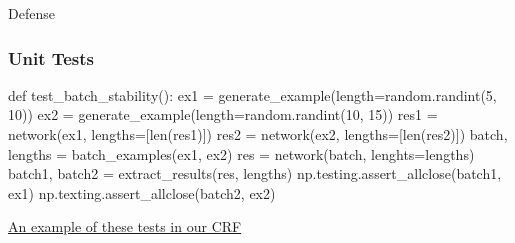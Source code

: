 \documentclass{beamer}
\begin{document}
\begin{section}{Defense}

\begin{frame}[fragile]
    \frametitle{Unit Tests}
    \begin{pythoncode}
def test_batch_stability():
    ex1 = generate_example(length=random.randint(5, 10))
    ex2 = generate_example(length=random.randint(10, 15))
    res1 = network(ex1, lengths=[len(res1)])
    res2 = network(ex2, lengths=[len(res2)])
    batch, lengths = batch_examples(ex1, ex2)
    res = network(batch, lenghts=lengths)
    batch1, batch2 = extract_results(res, lengths)
    np.testing.assert_allclose(batch1, ex1)
    np.texting.assert_allclose(batch2, ex2)
    \end{pythoncode}

    \href{https://github.com/dpressel/mead-baseline/blob/f98e64afcbab8a267fce5d13a434a981aa564d27/python/tests/test_crf_pytorch.p\#L265}{An
    example of these tests in our CRF}

\end{frame}

\end{section}
\end{document}
